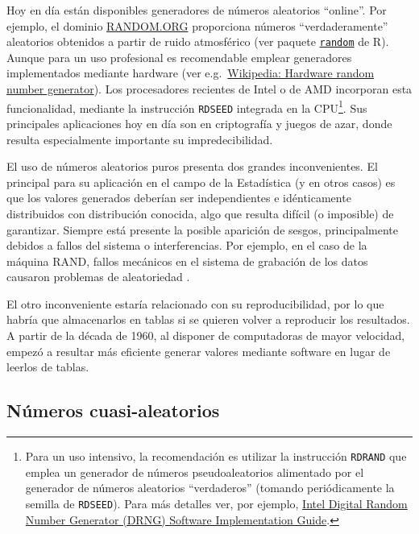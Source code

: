 \documentclass[
  10pt,
]{book}
\theoremstyle{break}
\theoremstyle{nonumberplain}
\let\oldfootnote\footnote
\renewcommand\footnote[1]{\oldfootnote{\hspace{2mm}#1}}
\begin{document}
Hoy en día están disponibles generadores de números aleatorios ``online''.
Por ejemplo, el dominio \href{http://www.random.org/integers}{RANDOM.ORG} proporciona números ``verdaderamente'' aleatorios obtenidos a partir de ruido atmosférico (ver paquete \href{https://CRAN.R-project.org/package=random}{\texttt{random}} de R).
Aunque para un uso profesional es recomendable emplear generadores implementados mediante hardware (ver e.g.~\href{https://en.wikipedia.org/wiki/Hardware_random_number_generator}{Wikipedia: Hardware random number generator}).
Los procesadores recientes de Intel o de AMD incorporan esta funcionalidad, mediante la instrucción \texttt{RDSEED} integrada en la CPU\footnote{Para un uso intensivo, la recomendación es utilizar la instrucción \texttt{RDRAND} que emplea un generador de números pseudoaleatorios alimentado por el generador de números aleatorios ``verdaderos'' (tomando periódicamente la semilla de \texttt{RDSEED}). Para más detalles ver, por ejemplo, \href{http://software.intel.com/en-us/articles/intel-digital-random-number-generator-drng-software-implementation-guide}{Intel Digital Random Number Generator (DRNG) Software Implementation Guide}.}.
Sus principales aplicaciones hoy en día son en criptografía y juegos de azar, donde resulta especialmente importante su impredecibilidad.

El uso de números aleatorios puros presenta dos grandes inconvenientes.
El principal para su aplicación en el campo de la Estadística (y en otros casos) es que los valores generados deberían ser independientes e idénticamente distribuidos con distribución conocida, algo que resulta difícil (o imposible) de garantizar.
Siempre está presente la posible aparición de sesgos, principalmente debidos a fallos del sistema o interferencias.
Por ejemplo, en el caso de la máquina RAND, fallos mecánicos en el sistema de grabación de los datos causaron problemas de aleatoriedad \citep[p.~118]{hacking1965}.

El otro inconveniente estaría relacionado con su reproducibilidad, por lo que habría que almacenarlos en tablas si se quieren volver a reproducir los resultados.
A partir de la década de 1960, al disponer de computadoras de mayor velocidad, empezó a resultar más eficiente generar valores mediante software en lugar de leerlos de tablas.

\hypertarget{nuxfameros-cuasi-aleatorios}{%
\subsection{Números cuasi-aleatorios}\label{nuxfameros-cuasi-aleatorios}}
\end{document}
